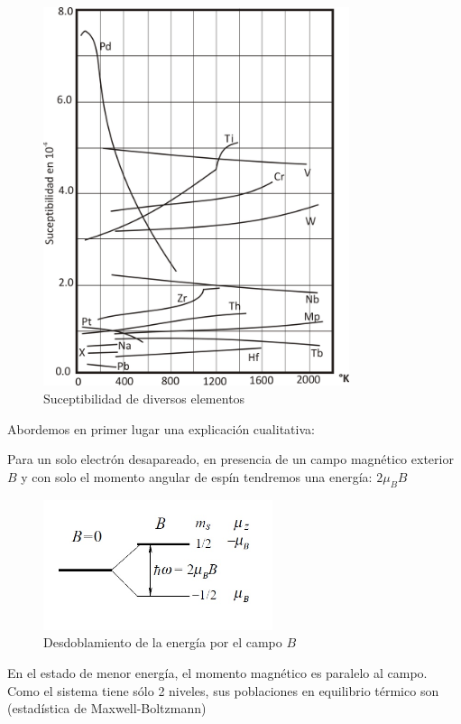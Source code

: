 \begin{figure}[H]
    \centering
    \includegraphics[width=0.8\textwidth]{./Figures/Suceptibilidad}
	\caption{Suceptibilidad de diversos elementos}
	\label{fig:Suceptibilidad}
\end{figure}

Abordemos en primer lugar una explicación cualitativa:

Para un solo electrón desapareado, en presencia de un campo magnético exterior $B$ y con solo el momento angular de espín tendremos una energía: $2\mu_{B}B$

\begin{figure}[H]
    \centering
    \includegraphics[width=0.6\textwidth]{./Figures/dosNiveles}
	\caption{Desdoblamiento de la energía por el campo $B$}
	\label{fig:dosNiveles}
\end{figure}

En el estado de menor energía, el momento magnético es paralelo al campo. Como el sistema tiene sólo 2 niveles, sus poblaciones en equilibrio térmico son (estadística de Maxwell-Boltzmann)

